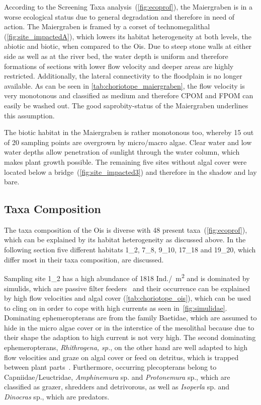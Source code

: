 According to the Screening Taxa analysis~(\cref{fig:ecoprof}), the Maiergraben is in a worse ecological status due to general degradation and therefore in need of action. The Maiergraben is framed by a corset of technomegalithal (\cref{fig:site_impactedA}), which lowers its habitat heterogeneity at both levels, the abiotic and biotic, when compared to the Ois. Due to steep stone walls at either side as well as at the river bed, the water depth is uniform and therefore formations of sections with lower flow velocity and deeper areas are highly restricted. Additionally, the lateral connectivity to the floodplain is no longer available. As can be seen in \cref{tab:choriotope_maiergraben}, the flow velocity is very monotonous and classified as medium and therefore CPOM and FPOM can easily be washed out. The good saprobity-status of the Maiergraben underlines this assumption.

The biotic habitat in the Maiergraben is rather monotonous too, whereby 15 out of 20 sampling points are overgrown by micro/macro algae. Clear water and low water depths allow penetration of sunlight through the water column, which makes plant growth possible. The remaining five sites without algal cover were located below a bridge~(\cref{fig:site_impacted3}) and therefore in the shadow and lay bare.


\subsection{Taxa Composition}\label{sec:taxa_composition_discussion}      %


The taxa composition of the Ois is diverse with 48 present taxa~(\cref{fig:ecoprof}), which can be explained by its habitat heterogeneity as discussed above. In the following section five different habitats 1\_2, 7\_8, 9\_10, 17\_18 and 19\_20, which differ most in their taxa composition, are discussed.

Sampling site 1\_2 has a high abundance of 1818 Ind./\SI{}{\square\meter} and is dominated by simulids, which are passive filter feeders~ and their occurrence can be explained by high flow velocities and algal cover (\cref{tab:choriotope_ois}), which can be used to cling on in order to cope with high currents as seen in~\cref{fig:simulidae}. Dominating ephemeropterans are from the family Baetidae, which are assumed to hide in the micro algae cover or in the interstice of the mesolithal because due to their shape the adaption to high current is not very high. The second dominating ephemeropterans, \emph{Rhithrogena, sp.}, on the other hand are well adapted to high flow velocities and graze on algal cover or feed on detritus, which is trapped between plant parts~. Furthermore, occurring plecopterans belong to Capniidae/Leuctridae, \emph{Amphinemura} sp. and \emph{Protonemura} sp., which are classified as grazer, shredders and detrivorous, as well as \emph{Isoperla} sp. and \emph{Dinocras} sp., which are predators.


